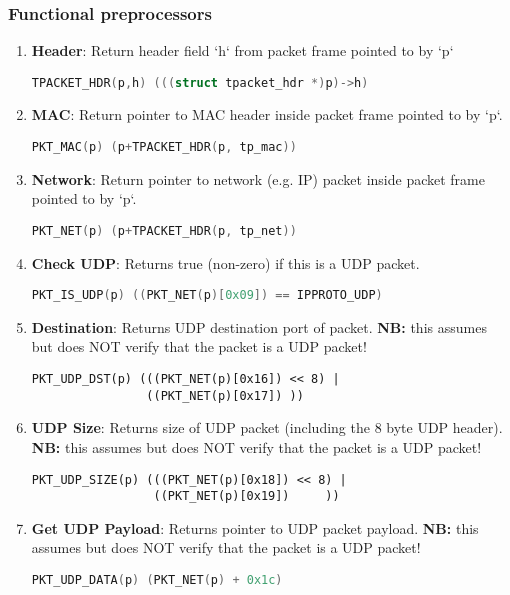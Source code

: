 \documentclass[12pt]{article}
\def\clst{\lstinline[basicstyle=\ttfamily,breaklines=true,language=C]}
\begin{document}
\subsubsection{Functional preprocessors}
\begin{enumerate}
\item {\bf Header}: Return header field `h` from packet frame pointed to by `p`

\clst{TPACKET_HDR(p,h) (((struct tpacket_hdr *)p)->h)}

\item {\bf MAC}: Return pointer to MAC header inside packet frame pointed to by `p`.

\clst{PKT_MAC(p) (p+TPACKET_HDR(p, tp_mac))}

\item {\bf Network}: Return pointer to network (e.g. IP) packet inside 
packet frame pointed to by `p`.

\clst{PKT_NET(p) (p+TPACKET_HDR(p, tp_net))}

\item {\bf Check UDP}: Returns true (non-zero) if this is a UDP packet.

\clst{PKT_IS_UDP(p) ((PKT_NET(p)[0x09]) == IPPROTO_UDP)}

\item {\bf Destination}:  Returns UDP destination port of packet. {\bf NB:} 
this assumes but does NOT verify that the packet is a UDP packet!

\begin{lstlisting}
PKT_UDP_DST(p) (((PKT_NET(p)[0x16]) << 8) | 
                ((PKT_NET(p)[0x17]) ))
\end{lstlisting}

\item {\bf UDP Size}: Returns size of UDP packet (including the 8 byte UDP header).
{\bf NB:} this assumes but does NOT verify that the packet is a UDP packet!
\begin{lstlisting}
PKT_UDP_SIZE(p) (((PKT_NET(p)[0x18]) << 8) |
                 ((PKT_NET(p)[0x19])     ))
\end{lstlisting}

\item {\bf Get UDP Payload}: Returns pointer to UDP packet payload.
{\bf NB:} this assumes but does NOT verify that the packet is a UDP packet!

\clst{PKT_UDP_DATA(p) (PKT_NET(p) + 0x1c)}

\end{enumerate}
\end{document}
